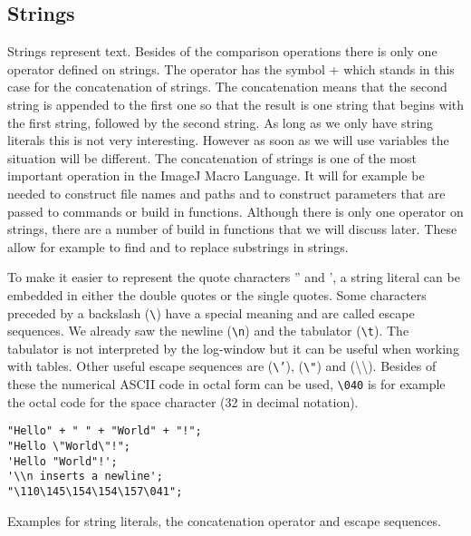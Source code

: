 \subsection{Strings}

Strings represent text. Besides of the comparison operations there is only one operator defined on strings. The operator has the symbol $+$ which stands in this case for the concatenation of strings. The concatenation means that the second string is appended to the first one so that the result is one string that begins with the first string, followed by the second string. As long as we only have string literals this is not very interesting. However as soon as we will use variables the situation will be different. The concatenation of strings is one of the most important operation in the ImageJ Macro Language. It will for example be needed to construct file names and paths and to construct parameters that are passed to commands or build in functions. Although there is only one operator on strings, there are a number of build in functions that we will discuss later. These allow for example to find and to replace substrings in strings.

To make it easier to represent the quote characters '' and ', a string literal can be embedded in either the double quotes or the single quotes. Some characters preceded by a backslash ({\tt \textbackslash}) have a special meaning and are called escape sequences. We already saw the newline ({\tt \textbackslash n}) and the tabulator ({\tt \textbackslash t}). The tabulator is not interpreted by the log-window but it can be useful when working with tables. Other useful escape sequences are ({\tt \textbackslash '}), ({\tt \textbackslash"}) and ({\textbackslash\textbackslash}). Besides of these the numerical ASCII code \cite{_ascii_code_1963} in octal form can be used, {\tt \textbackslash 040} is for example the octal code for the space character (32 in decimal notation).  

\begin{listing}[H]
\begin{verbatim}
"Hello" + " " + "World" + "!";
"Hello \"World\"!";
'Hello "World"!';
'\\n inserts a newline';
"\110\145\154\154\157\041";
\end{verbatim}
\caption{Examples for string literals, the concatenation operator and escape sequences.}
\label{lst:string_concatenation}
\end{listing}

